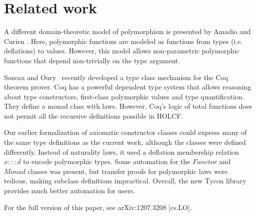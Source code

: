 \documentclass{sigplanconf}
\newcommand{\hsc}[1]{\ensuremath{\mathit{#1}}}
\theoremstyle{definition}
\begin{document}
\section{Related work}
\label{sec:conclusion}


A different domain-theoretic model of polymorphism is presented by Amadio and Curien \cite{amadio+curien}. Here, polymorphic functions are modeled as functions from types (i.e. deflations) to values. However, this model allows non-parametric polymorphic functions that depend non-trivially on the type argument.

Sozeau and Oury~\cite{Sozeau2008} recently developed a type class mechanism for the Coq theorem prover. Coq has a powerful dependent type system that allows reasoning about type constructors, first-class polymorphic values and type quantification. They define a monad class with laws. However, Coq's logic of total functions does not permit all the recursive definitions possible in HOLCF.

Our earlier formalization of axiomatic constructor classes \cite{HMW2005} could express many of the same type definitions as the current work, although the classes were defined differently. Instead of naturality laws, it used a deflation membership relation $x ::: d$ to encode polymorphic types.
Some automation for the \hsc{Functor} and \hsc{Monad} classes was present, but transfer proofs for polymorphic laws were tedious, making subclass definitions impractical. Overall, the new Tycon library provides much better automation for users.

For the full version of this paper, see arXiv:1207.3208 [cs.LO].




\end{document}
